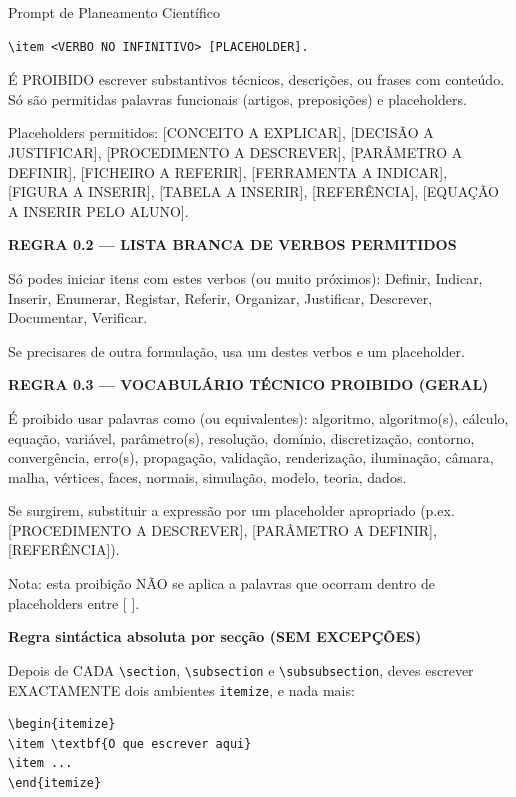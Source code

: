 \documentclass[12pt,a4paper,twoside]{report}
\begin{document}
\begin{promptcientifico}{Prompt de Planeamento Científico}
\begin{verbatim}
\item <VERBO NO INFINITIVO> [PLACEHOLDER].
\end{verbatim}

É PROIBIDO escrever substantivos técnicos, descrições, ou frases com conteúdo.
Só são permitidas palavras funcionais (artigos, preposições) e placeholders.

Placeholders permitidos:
[CONCEITO A EXPLICAR], [DECISÃO A JUSTIFICAR], [PROCEDIMENTO A DESCREVER],
[PARÂMETRO A DEFINIR], [FICHEIRO A REFERIR], [FERRAMENTA A INDICAR],
[FIGURA A INSERIR], [TABELA A INSERIR], [REFERÊNCIA], [EQUAÇÃO A INSERIR PELO ALUNO].

\textbf{REGRA 0.2 — LISTA BRANCA DE VERBOS PERMITIDOS}

Só podes iniciar itens com estes verbos (ou muito próximos):
Definir, Indicar, Inserir, Enumerar, Registar, Referir, Organizar, Justificar, Descrever, Documentar, Verificar.

Se precisares de outra formulação, usa um destes verbos e um placeholder.

\textbf{REGRA 0.3 — VOCABULÁRIO TÉCNICO PROIBIDO (GERAL)}

É proibido usar palavras como (ou equivalentes):
algoritmo, algoritmo(s), cálculo, equação, variável, parâmetro(s),
resolução, domínio, discretização, contorno, convergência,
erro(s), propagação, validação, renderização, iluminação, câmara,
malha, vértices, faces, normais, simulação, modelo, teoria, dados.

Se surgirem, substituir a expressão por um placeholder apropriado
(p.ex. [PROCEDIMENTO A DESCREVER], [PARÂMETRO A DEFINIR], [REFERÊNCIA]).

Nota: esta proibição NÃO se aplica a palavras que ocorram dentro de placeholders entre [ ].

\textbf{Regra sintáctica absoluta por secção (SEM EXCEPÇÕES)}

Depois de CADA \texttt{\textbackslash section}, \texttt{\textbackslash subsection} e \texttt{\textbackslash subsubsection},
deves escrever EXACTAMENTE dois ambientes \texttt{itemize}, e nada mais:

\begin{verbatim}
\begin{itemize}
\item \textbf{O que escrever aqui}
\item ...
\end{itemize}


\end{verbatim}
\end{promptcientifico}
\end{document}
